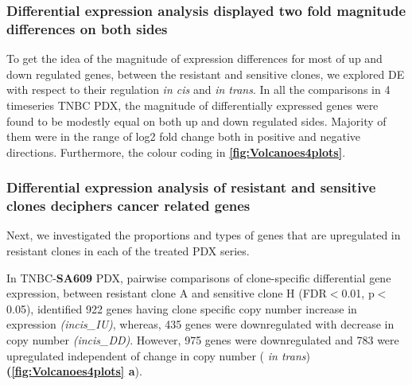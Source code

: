
\subsubsection{Differential expression analysis displayed two fold  magnitude differences on both sides}
To get the idea of the magnitude of expression differences for most of up and down regulated genes, between the resistant and sensitive clones, we explored \ac{DE} with respect to their regulation \textit{in cis} and \textit{in trans}. In all the comparisons in 4 timeseries TNBC PDX, the magnitude of differentially expressed genes were found to be modestly equal on both up and down regulated sides. Majority of them were in the range of log2 fold change both in positive and negative directions. Furthermore, the colour coding in \textbf{\autoref{fig:Volcanoes4plots}}.

\subsubsection{Differential expression analysis of resistant and sensitive clones deciphers cancer related genes}
 Next, we investigated the proportions and types of genes that are upregulated in resistant clones in each of the treated PDX series.
 
 In TNBC-\textbf{SA609} PDX, pairwise comparisons of clone-specific differential gene expression, between resistant clone A and sensitive clone H (FDR$<$0.01, p$<$0.05), identified 922 genes having clone specific copy number increase in expression \textit{(incis\_IU)}, whereas, 435 genes were downregulated with decrease in copy number \textit{(incis\_DD)}. However, 975 genes were downregulated and 783 were upregulated independent of change in copy number ( \textit{in trans}) \textbf{(\autoref{fig:Volcanoes4plots} a}). 
 
